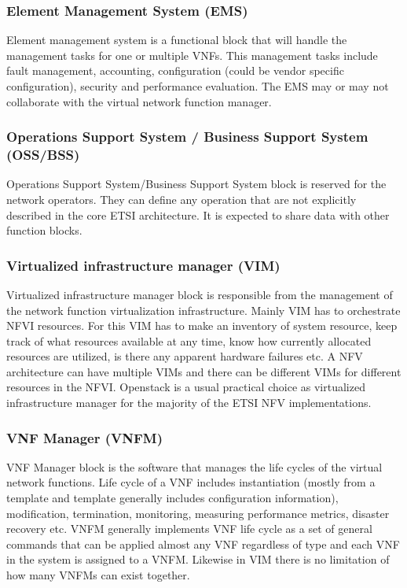 \documentclass[12pt,oneandhalf,chaparabic,ceng,ms,eng,oneside,pntc]{gsufbe}
\begin{document}
\subsubsection{Element Management System (EMS)}
Element management system is a functional block that will handle the management tasks for one or
multiple VNFs. This management tasks include fault management, accounting, configuration (could be 
vendor specific configuration), security and performance evaluation. The EMS may or may not collaborate
with the virtual network function manager.

\subsubsection{Operations Support System / Business Support System (OSS/BSS)}
Operations Support System/Business Support System block is reserved for the network
operators. They can define any operation that are not explicitly described in the core
ETSI architecture. It is expected to share data with other function blocks.

\subsubsection{Virtualized infrastructure manager (VIM)}
Virtualized infrastructure manager block is responsible from the management of the network function
virtualization infrastructure. Mainly VIM has to orchestrate NFVI resources. For this VIM has to make
an inventory of system resource, keep track of what resources available at any time, know how currently
allocated resources are utilized, is there any apparent hardware failures etc.
A NFV architecture can have multiple VIMs and there can be different VIMs for different resources in 
the NFVI. Openstack is a usual practical choice as virtualized infrastructure manager for the majority
of the ETSI NFV implementations.

\subsubsection{VNF Manager (VNFM)}
VNF Manager block is the software that manages the life cycles of the virtual network functions. Life
cycle of a VNF includes instantiation (mostly from a template and template generally includes
configuration information), modification, termination, monitoring, measuring performance metrics,
disaster recovery etc. VNFM generally implements VNF life cycle as a set of general commands that can
be applied almost any VNF regardless of type and each VNF in the system is assigned to a VNFM.
Likewise in VIM there is no limitation of how many VNFMs can exist together.
\end{document}
